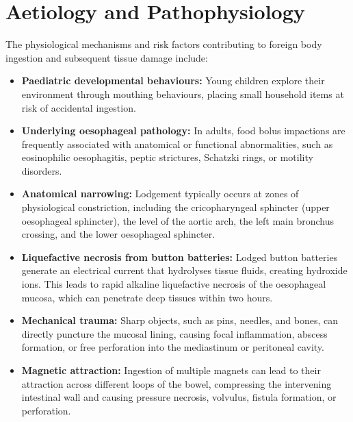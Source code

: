 \section*{Aetiology and Pathophysiology}
The physiological mechanisms and risk factors contributing to foreign body ingestion and subsequent tissue damage include:
\begin{itemize}
    \item \textbf{Paediatric developmental behaviours:} Young children explore their environment through mouthing behaviours, placing small household items at risk of accidental ingestion.
    \item \textbf{Underlying oesophageal pathology:} In adults, food bolus impactions are frequently associated with anatomical or functional abnormalities, such as eosinophilic oesophagitis, peptic strictures, Schatzki rings, or motility disorders.
    \item \textbf{Anatomical narrowing:} Lodgement typically occurs at zones of physiological constriction, including the cricopharyngeal sphincter (upper oesophageal sphincter), the level of the aortic arch, the left main bronchus crossing, and the lower oesophageal sphincter.
    \item \textbf{Liquefactive necrosis from button batteries:} Lodged button batteries generate an electrical current that hydrolyses tissue fluids, creating hydroxide ions. This leads to rapid alkaline liquefactive necrosis of the oesophageal mucosa, which can penetrate deep tissues within two hours.
    \item \textbf{Mechanical trauma:} Sharp objects, such as pins, needles, and bones, can directly puncture the mucosal lining, causing focal inflammation, abscess formation, or free perforation into the mediastinum or peritoneal cavity.
    \item \textbf{Magnetic attraction:} Ingestion of multiple magnets can lead to their attraction across different loops of the bowel, compressing the intervening intestinal wall and causing pressure necrosis, volvulus, fistula formation, or perforation.
\end{itemize}

